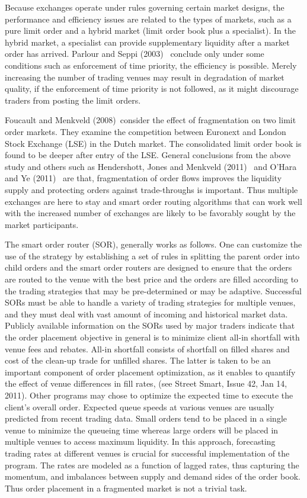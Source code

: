 Because exchanges operate under rules governing certain market designs, the performance and efficiency issues are related to the types of markets, such as a pure limit order and a hybrid market (limit order book plus a specialist). In the hybrid market, a specialist can provide supplementary liquidity after a market order has arrived. Parlour and Seppi (2003)~\cite{parlour2003} conclude only under some conditions such as enforcement of time priority, the efficiency is possible. Merely increasing the number of trading venues may result in degradation of market quality, if the enforcement of time priority is not followed, as it might discourage traders from posting the limit orders.


Foucault and Menkveld (2008)~\cite{foumen}consider the effect of fragmentation on two limit order markets. They examine the competition between Euronext and London Stock Exchange (LSE) in the Dutch market. The consolidated limit order book is found to be deeper after entry of the LSE. General conclusions from the above study and others such as Hendershott, Jones and Menkveld (2011)~\cite{hjm} and O'Hara and Ye (2011)~\cite{oye} are that, fragmentation of order flows improves the liquidity supply and protecting orders against trade-throughs is important. Thus multiple exchanges are here to stay and smart order routing algorithms that can work well with the increased number of exchanges are likely to be favorably sought by the market participants.


The smart order router (SOR), generally works as follows. One can customize the use of the strategy by establishing a set of rules in splitting the parent order into child orders and the smart order routers are designed to ensure that the orders are routed to the venue with the best price and the orders are filled according to the trading strategies that may be pre-determined or may be adaptive. Successful SORs must be able to handle a variety of trading strategies for multiple venues, and they must deal with vast amount of incoming and historical market data. Publicly available information on the SORs used by major traders indicate that the order placement objective in general is to minimize client all-in shortfall with venue fees and rebates. All-in shortfall consists of shortfall on filled shares and cost of the clean-up trade for unfilled shares. The latter is taken to be an important component of order placement optimization, as it enables to quantify the effect of venue differences in fill rates, (see Street Smart, Issue 42, Jan 14, 2011). Other programs may chose to optimize the expected time to execute the client's overall order. Expected queue speeds at various venues are usually predicted from recent trading data. Small orders tend to be placed in a single venue to minimize the queueing time whereas large orders will be placed in multiple venues to access maximum liquidity. In this approach, forecasting trading rates at different venues is crucial for successful implementation of the program. The rates are modeled as a function of lagged rates, thus capturing the momentum, and imbalances between supply and demand sides of the order book. Thus order placement in a fragmented market is not a trivial task.


